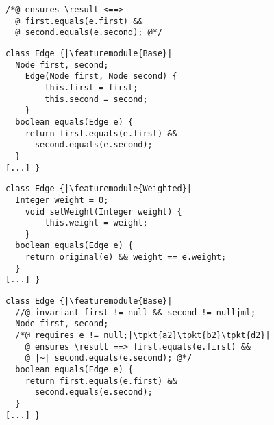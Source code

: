 \newsavebox{\blamepost}
\begin{lrbox}{\blamepost}
\begin{lstlisting}
/*@ ensures \result <==>
  @ first.equals(e.first) &&
  @ second.equals(e.second); @*/
\end{lstlisting}
\end{lrbox}


\newsavebox{\fopbase}
\begin{lrbox}{\fopbase}
	\begin{minipage}{72mm}
\begin{lstlisting}
class Edge {|\featuremodule{Base}|
  Node first, second;
	Edge(Node first, Node second) {
		this.first = first;
		this.second = second;
	}
  boolean equals(Edge e) {
    return first.equals(e.first) &&
      second.equals(e.second);
  }
[...] }
\end{lstlisting}
	\end{minipage}
\end{lrbox}

\newsavebox{\fopweight}
\begin{lrbox}{\fopweight}
	\begin{minipage}{72mm}
\begin{lstlisting}
class Edge {|\featuremodule{Weighted}|
  Integer weight = 0;
	void setWeight(Integer weight) {
		this.weight = weight;
	}
  boolean equals(Edge e) {
    return original(e) && weight == e.weight;
  }
[...] }
\end{lstlisting}
	\end{minipage}
\end{lrbox}


\newsavebox{\pcbase}
\begin{lrbox}{\pcbase}
	\begin{minipage}{72mm}
\begin{lstlisting}
class Edge {|\featuremodule{Base}|
  //@ invariant first != null && second != nulljml;
  Node first, second;
  /*@ requires e != null;|\tpkt{a2}\tpkt{b2}\tpkt{d2}|
    @ ensures \result ==> first.equals(e.first) &&
    @ |~| second.equals(e.second); @*/
  boolean equals(Edge e) {
    return first.equals(e.first) &&
      second.equals(e.second);
  }
[...] }
\end{lstlisting}
	\end{minipage}
\end{lrbox}

